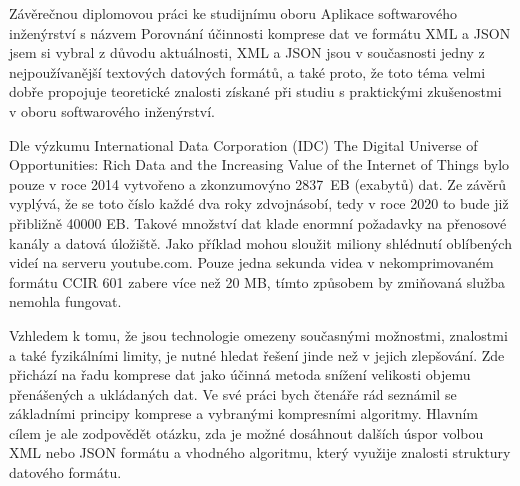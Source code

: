 Závěrečnou diplomovou práci ke studijnímu oboru Aplikace softwarového inženýrství s názvem Porovnání účinnosti komprese dat ve formátu XML a JSON jsem si vybral z důvodu aktuálnosti, XML a JSON jsou v současnosti jedny z nejpoužívanější textových datových formátů, a také proto, že toto téma velmi dobře propojuje teoretické znalosti získané při studiu s praktickými zkušenostmi v oboru softwarového inženýrství.

Dle výzkumu International Data Corporation (IDC) The Digital Universe of Opportunities: Rich Data and the Increasing Value of the Internet of Things \cite{idc} bylo pouze v roce 2014 vytvořeno a zkonzumovýno 2837~EB (exabytů) dat. Ze závěrů vyplývá, že se toto číslo každé dva roky zdvojnásobí, tedy v roce 2020 to bude již přibližně 40000 EB. Takové množství dat klade enormní požadavky na přenosové kanály a datová úložiště. Jako příklad mohou sloužit miliony shlédnutí oblíbených videí na serveru youtube.com. Pouze jedna sekunda videa v nekomprimovaném formátu CCIR 601 zabere více než 20 MB, tímto způsobem by zmiňovaná služba nemohla fungovat.

Vzhledem k tomu, že jsou technologie omezeny současnými možnostmi, znalostmi a také fyzikálními limity, je nutné hledat řešení jinde než v jejich zlepšování. Zde přichází na řadu komprese dat jako účinná metoda snížení velikosti objemu přenášených a ukládaných dat. Ve své práci bych čtenáře rád seznámil se základními principy komprese a vybranými kompresními algoritmy. Hlavním cílem je ale zodpovědět otázku, zda je možné dosáhnout dalších úspor volbou XML nebo JSON formátu a vhodného algoritmu, který využije znalosti struktury datového formátu.

